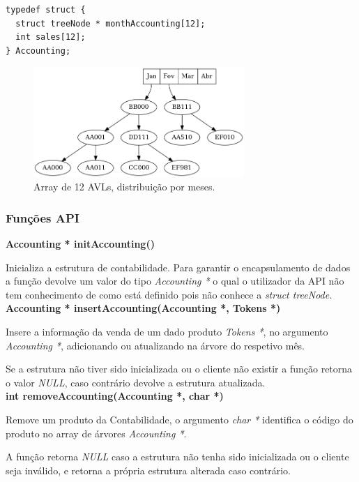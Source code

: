 \documentclass[10pt] {article}
\begin{document}
\begin{lstlisting}
typedef struct {
  struct treeNode * monthAccounting[12];
  int sales[12];
} Accounting;
\end{lstlisting}
\begin{figure}[ht!]
\centering
\includegraphics[width=80mm]{accounting.png}
\caption{Array de 12 AVLs, distribuição por meses.}
\end{figure}

\subsubsection{Funções API}
\noindent \textbf {Accounting * initAccounting()}
\par Inicializa a estrutura de contabilidade.  Para garantir o encapsulamento de dados a função devolve um valor do tipo \emph{Accounting *} o qual o utilizador da API
não tem conhecimento de como está definido pois não conhece a \emph{struct treeNode.} \\

\noindent \textbf {Accounting * insertAccounting(Accounting *, Tokens *)}
\par Insere a informação da venda de um dado produto \emph{Tokens *}, no argumento \emph{Accounting *}, adicionando ou atualizando na árvore do respetivo mês.
\par Se a estrutura não tiver sido inicializada ou o cliente não existir a função retorna o valor \emph{NULL},
caso contrário devolve a estrutura atualizada. \\

\noindent \textbf {int removeAccounting(Accounting *, char *)}
\par Remove um produto da Contabilidade, o argumento \emph{char *} identifica o código do produto no array de árvores \emph{Accounting *}.
\par A função retorna \emph{NULL} caso a estrutura não tenha sido inicializada ou o cliente seja inválido, e retorna a própria estrutura alterada caso contrário. \\
\end{document}
